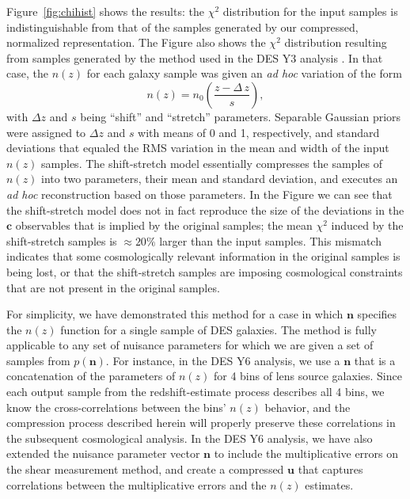 \documentclass[linenumbers, onecolumn]{aastex7}
\newcommand{\vecc}{\ensuremath{\mathbf{c}}}
\newcommand{\vecn}{\ensuremath{\mathbf{n}}}
\newcommand{\vecu}{\ensuremath{\mathbf{u}}}
\begin{document}
Figure~\ref{fig:chihist} shows the results: the $\chi^2$ distribution
for the input samples is indistinguishable from that of the samples
generated by our compressed, normalized representation.
The Figure also shows the $\chi^2$ distribution resulting from samples
generated by the method used in the DES Y3 analysis \citep{y3pz}.  In
that case, the $n(z)$ for each galaxy sample was given an \textit{ad
  hoc} variation of the form
\begin{equation}
  n(z) = n_0\left(\frac{z-\Delta\,z}{s}\right),
  \label{eq:zs}
\end{equation}
with $\Delta z$ and $s$ being ``shift'' and ``stretch'' parameters.
Separable Gaussian priors were assigned to $\Delta z$ and $s$ with
means of 0 and 1, respectively, and standard deviations that equaled
the RMS variation in the mean and width of the input $n(z)$ samples.
The shift-stretch model essentially compresses the samples of $n(z)$
into two parameters, their mean and standard deviation, and executes
an \textit{ad hoc} reconstruction based on those parameters.
In the Figure we can see that the shift-stretch model does not in fact
reproduce the size of the deviations in the $\vecc$ observables that
is implied by the original samples; the mean $\chi^2$ induced by the
shift-stretch samples is $\approx20\%$ larger than the input samples.  
This mismatch indicates that some cosmologically relevant information in the
original samples is being lost, or that the shift-stretch samples are
imposing cosmological constraints that are not present in the original
samples.

For simplicity, we have demonstrated this method for a case in which
$\vecn$ specifies the $n(z)$ function for a single sample of DES
galaxies.  The method is fully applicable to any set of nuisance
parameters for which we are given a set of samples from $p(\vecn).$
For instance, in the DES Y6 analysis, we use a $\vecn$ that is a
concatenation of the parameters of $n(z)$ for 4 bins of lens source
galaxies.  Since each output sample from the  redshift-estimate
process describes all 4 bins, we know the cross-correlations between
the bins' $n(z)$ behavior, and the compression process described
herein will properly preserve these correlations in the subsequent
cosmological analysis.  In the DES Y6 analysis, we have also extended
the nuisance parameter vector $\vecn$ to include the multiplicative
errors on the shear measurement method, and create a compressed
$\vecu$ that captures correlations between the multiplicative errors
and the $n(z)$ estimates.
\end{document}

